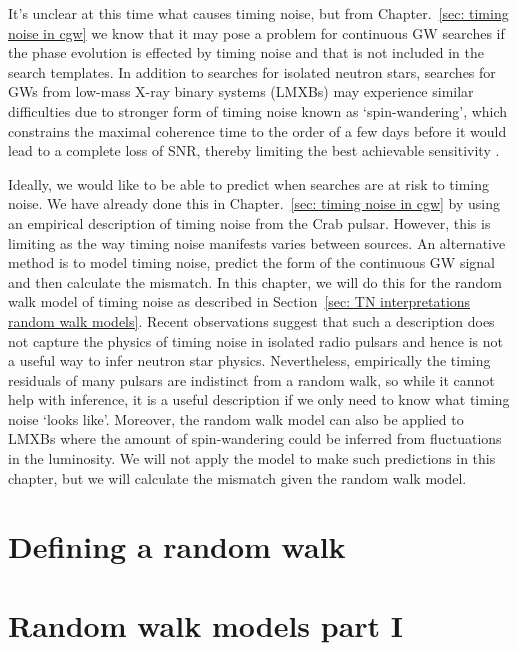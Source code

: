 \documentclass[../full_thesis/full_thesis.tex]{subfiles}
\newcommand{\thisdir}{../analytic_timing_noise_cgw}
\begin{document}
It's unclear at this time what causes timing noise, but from Chapter.~\ref{sec:
timing noise in cgw} we know that it may pose a problem for continuous GW
searches if the phase evolution is effected by timing noise and that is not
included in the search templates. In addition to searches for isolated neutron
stars, searches for GWs from low-mass X-ray binary systems (LMXBs) may
experience similar difficulties due to stronger form of timing noise known as
`spin-wandering', which constrains the maximal coherence time to the order of a
few days before it would lead to a complete loss of SNR, thereby limiting the
best achievable sensitivity \citep[see][for
details]{ligo2015scox1,leaci2015,ScoX1:MDC1}.

Ideally, we would like to be able to predict when searches are at risk to
timing noise.  We have already done this in Chapter.~\ref{sec: timing noise in
cgw} by using an empirical description of timing noise from the Crab pulsar.
However, this is limiting as the way timing noise manifests varies between
sources. An alternative method is to model timing noise, predict the form of
the continuous GW signal and then calculate the mismatch. In this chapter, we
will do this for the random walk model of timing noise as described in
Section~\ref{sec: TN interpretations random walk models}.  Recent observations
\citep{Hobbs2010} suggest that such a description does not capture the physics
of timing noise in isolated radio pulsars and hence is not a useful way to
infer neutron star physics. Nevertheless, empirically the timing residuals of
many pulsars are indistinct from a random walk, so while it cannot help with
inference, it is a useful description if we only need to know what timing noise
`looks like'. Moreover, the random walk model can also be applied to LMXBs
where the amount of spin-wandering could be inferred from fluctuations in the
luminosity. We will not apply the model to make such predictions in this
chapter, but we will calculate the mismatch given the random walk model.


\section{Defining a random walk}
\label{sec: Defining a random walk}


\section{Random walk models part I}
\label{sec: Random walk models part I}

\end{document}
